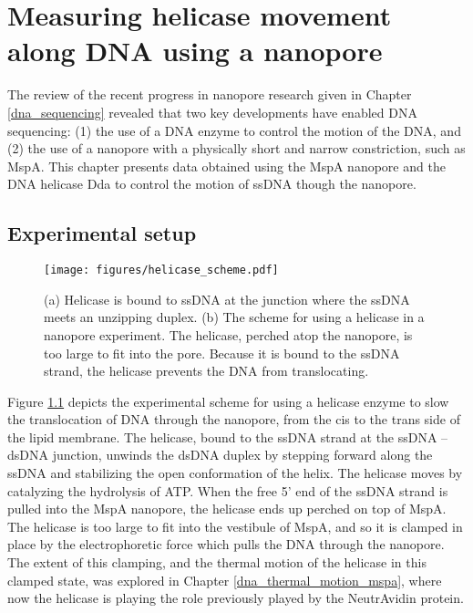 
\chapter{Measuring helicase movement along DNA using a nanopore}
\label{helicase_on_dna}

The review of the recent progress in nanopore research given in Chapter \ref{dna_sequencing} revealed that two key developments have enabled DNA sequencing: (1) the use of a DNA enzyme to control the motion of the DNA, and (2) the use of a nanopore with a physically short and narrow constriction, such as MspA.  This chapter presents data obtained using the MspA nanopore and the DNA helicase Dda to control the motion of ssDNA though the nanopore.

\section{Experimental setup}

\begin{figure}[h]
\begin{centering}
\texttt{[image: figures/helicase\_scheme.pdf]}
\caption[Helicase can control DNA translocation]{(a) Helicase is bound to ssDNA at the junction where the ssDNA meets an unzipping duplex.  (b) The scheme for using a helicase in a nanopore experiment.  The helicase, perched atop the nanopore, is too large to fit into the pore.  Because it is bound to the ssDNA strand, the helicase prevents the DNA from translocating.}
\label{fig:helicase_scheme}
\end{centering}
\end{figure}

Figure \ref{fig:helicase_scheme} depicts the experimental scheme for using a helicase enzyme to slow the translocation of DNA through the nanopore, from the cis to the trans side of the lipid membrane.  The helicase, bound to the ssDNA strand at the ssDNA – dsDNA junction, unwinds the dsDNA duplex by stepping forward along the ssDNA and stabilizing the open conformation of the helix.  The helicase moves by catalyzing the hydrolysis of ATP.  When the free 5’ end of the ssDNA strand is pulled into the MspA nanopore, the helicase ends up perched on top of MspA.  The helicase is too large to fit into the vestibule of MspA, and so it is clamped in place by the electrophoretic force which pulls the DNA through the nanopore.  The extent of this clamping, and the thermal motion of the helicase in this clamped state, was explored in Chapter \ref{dna_thermal_motion_mspa}, where now the helicase is playing the role previously played by the NeutrAvidin protein.

